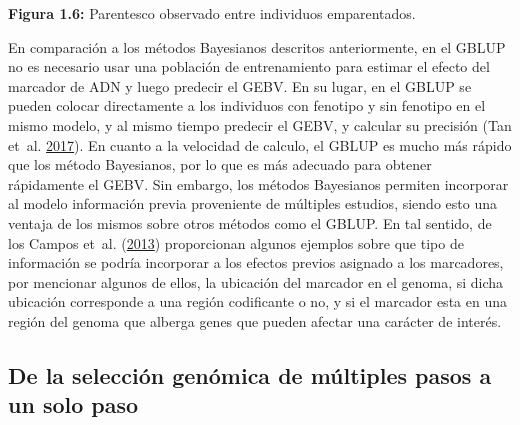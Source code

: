\documentclass[11pt,spanish,a4paper,oneside,]{book} %
\begin{document}
\begin{center}
\textbf{Figura 1.6:} Parentesco observado entre individuos emparentados.

\end{center}

En comparación a los métodos Bayesianos descritos anteriormente, en el GBLUP no es necesario usar una población de entrenamiento para estimar el efecto del marcador de ADN y luego predecir el GEBV. En su lugar, en el GBLUP se pueden colocar directamente a los individuos con fenotipo y sin fenotipo en el mismo modelo, y al mismo tiempo predecir el GEBV, y calcular su precisión (Tan et~al. \protect\hyperlink{ref-cite:34}{2017}). En cuanto a la velocidad de calculo, el GBLUP es mucho más rápido que los método Bayesianos, por lo que es más adecuado para obtener rápidamente el GEBV. Sin embargo, los métodos Bayesianos permiten incorporar al modelo información previa proveniente de múltiples estudios, siendo esto una ventaja de los mismos sobre otros métodos como el GBLUP. En tal sentido, de los Campos et~al. (\protect\hyperlink{ref-cite:31}{2013}) proporcionan algunos ejemplos sobre que tipo de información se podría incorporar a los efectos previos asignado a los marcadores, por mencionar algunos de ellos, la ubicación del marcador en el genoma, si dicha ubicación corresponde a una región codificante o no, y si el marcador esta en una región del genoma que alberga genes que pueden afectar una carácter de interés.

\hypertarget{de-la-selecciuxf3n-genuxf3mica-de-muxfaltiples-pasos-a-un-solo-paso}{%
\subsection{De la selección genómica de múltiples pasos a un solo paso}\label{de-la-selecciuxf3n-genuxf3mica-de-muxfaltiples-pasos-a-un-solo-paso}}
\end{document}
